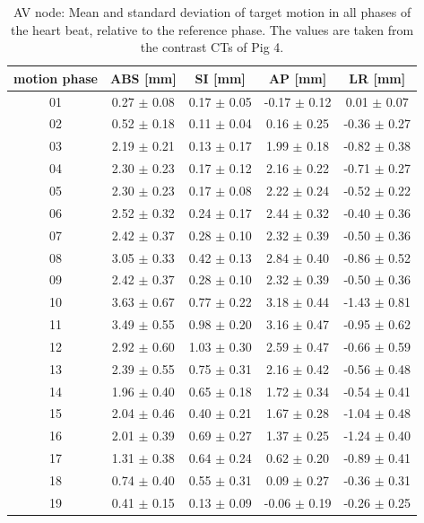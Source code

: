 \documentclass[type=dr, dr=rernat, accentcolor=tud7b,colorbacktitle, bigchapter, openright, twoside, 12pt ]{tudthesis}
\begin{document}
\newpage

\begin{table}[htbp]
  \centering
  \caption{AV node: Mean and standard deviation of target motion in all phases of the heart beat, relative to the reference phase. The values are 
  taken from the contrast CTs of Pig 4.}
  \begin{tabular}{|c|c|c|c|c|}
    \hline\hline
    motion phase\rule{0pt}{2.6ex}\rule[-1.2ex]{0pt}{0pt} & ABS [mm] & SI [mm] & AP [mm] & LR [mm]\\
    \hline
01 &0.27 $\pm$ 0.08 &0.17 $\pm$ 0.05 &-0.17 $\pm$ 0.12 &0.01 $\pm$ 0.07 \\
02 &0.52 $\pm$ 0.18 &0.11 $\pm$ 0.04 &0.16 $\pm$ 0.25 &-0.36 $\pm$ 0.27 \\
03 &2.19 $\pm$ 0.21 &0.13 $\pm$ 0.17 &1.99 $\pm$ 0.18 &-0.82 $\pm$ 0.38 \\
04 &2.30 $\pm$ 0.23 &0.17 $\pm$ 0.12 &2.16 $\pm$ 0.22 &-0.71 $\pm$ 0.27 \\
05 &2.30 $\pm$ 0.23 &0.17 $\pm$ 0.08 &2.22 $\pm$ 0.24 &-0.52 $\pm$ 0.22 \\
06 &2.52 $\pm$ 0.32 &0.24 $\pm$ 0.17 &2.44 $\pm$ 0.32 &-0.40 $\pm$ 0.36 \\
07 &2.42 $\pm$ 0.37 &0.28 $\pm$ 0.10 &2.32 $\pm$ 0.39 &-0.50 $\pm$ 0.36 \\
08 &3.05 $\pm$ 0.33 &0.42 $\pm$ 0.13 &2.84 $\pm$ 0.40 &-0.86 $\pm$ 0.52 \\
09 &2.42 $\pm$ 0.37 &0.28 $\pm$ 0.10 &2.32 $\pm$ 0.39 &-0.50 $\pm$ 0.36 \\
10 &3.63 $\pm$ 0.67 &0.77 $\pm$ 0.22 &3.18 $\pm$ 0.44 &-1.43 $\pm$ 0.81 \\
11 &3.49 $\pm$ 0.55 &0.98 $\pm$ 0.20 &3.16 $\pm$ 0.47 &-0.95 $\pm$ 0.62 \\
12 &2.92 $\pm$ 0.60 &1.03 $\pm$ 0.30 &2.59 $\pm$ 0.47 &-0.66 $\pm$ 0.59 \\
13 &2.39 $\pm$ 0.55 &0.75 $\pm$ 0.31 &2.16 $\pm$ 0.42 &-0.56 $\pm$ 0.48 \\
14 &1.96 $\pm$ 0.40 &0.65 $\pm$ 0.18 &1.72 $\pm$ 0.34 &-0.54 $\pm$ 0.41 \\
15 &2.04 $\pm$ 0.46 &0.40 $\pm$ 0.21 &1.67 $\pm$ 0.28 &-1.04 $\pm$ 0.48 \\
16 &2.01 $\pm$ 0.39 &0.69 $\pm$ 0.27 &1.37 $\pm$ 0.25 &-1.24 $\pm$ 0.40 \\
17 &1.31 $\pm$ 0.38 &0.64 $\pm$ 0.24 &0.62 $\pm$ 0.20 &-0.89 $\pm$ 0.41 \\
18 &0.74 $\pm$ 0.40 &0.55 $\pm$ 0.31 &0.09 $\pm$ 0.27 &-0.36 $\pm$ 0.31 \\
19 &0.41 $\pm$ 0.15 &0.13 $\pm$ 0.09 &-0.06 $\pm$ 0.19 &-0.26 $\pm$ 0.25 \\
    \hline\hline
  \end{tabular}
  \label{tab:motion:AV:Pig4}
\end{table}
\end{document}
